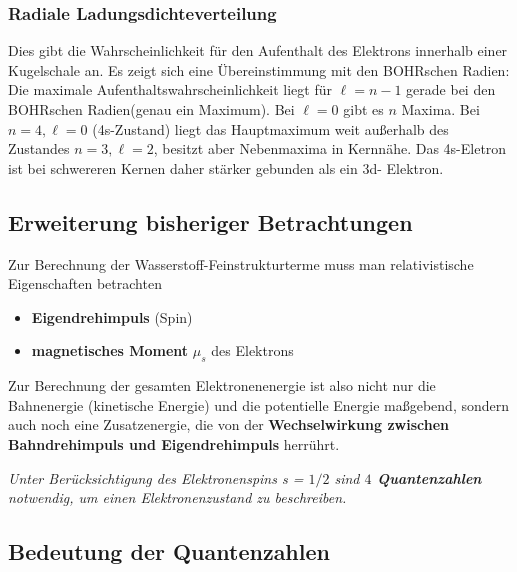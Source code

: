 \documentclass[12pt,a4paper,ngerman]{article}
\begin{document}
\subsubsection*{Radiale Ladungsdichteverteilung}
Dies gibt die Wahrscheinlichkeit für den Aufenthalt des Elektrons innerhalb einer Kugelschale an. Es zeigt sich eine Übereinstimmung mit den BOHRschen Radien: Die maximale Aufenthaltswahrscheinlichkeit liegt für $\ell = n-1$ gerade bei den BOHRschen Radien(genau ein Maximum). Bei $\ell = 0$ gibt es $n$ Maxima. Bei $n=4,\ell = 0$ (4s-Zustand) liegt das Hauptmaximum weit außerhalb des Zustandes $n=3, \ell = 2$, besitzt aber Nebenmaxima in Kernnähe. Das 4s-Eletron ist bei schwereren Kernen daher stärker gebunden als ein 3d- Elektron. 
\pagebreak

\subsection{Erweiterung bisheriger Betrachtungen}
Zur Berechnung der Wasserstoff-Feinstrukturterme muss man relativistische Eigenschaften betrachten
\begin{itemize}
\item \textbf{Eigendrehimpuls} (Spin)
\item \textbf{magnetisches Moment} $\mu_s$ des Elektrons
\end{itemize}
Zur Berechnung der gesamten Elektronenenergie ist also nicht nur die Bahnenergie (kinetische Energie) und die potentielle Energie maßgebend, sondern auch noch eine Zusatzenergie, die von der \textbf{Wechselwirkung zwischen Bahndrehimpuls und Eigendrehimpuls} herrührt. 
\begin{center}
\textit{Unter Berücksichtigung des Elektronenspins s = $1/2$ sind \textbf{$4$ Quantenzahlen} notwendig, um einen Elektronenzustand zu beschreiben. }
\end{center}


\subsection{Bedeutung der Quantenzahlen}
\end{document}
